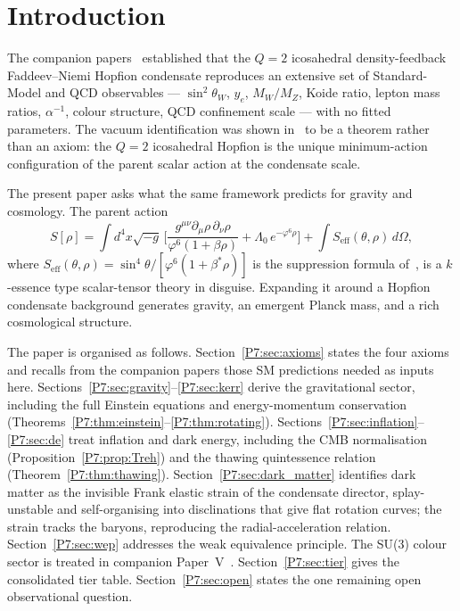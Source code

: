 \documentclass[11pt,a4paper]{article}
\theoremstyle{definition}
\theoremstyle{remark}
\newcommand{\vp}{\varphi}
\newcommand{\bst}{\beta^{*}}
\newcommand{\sinW}{\sin^{2}\!\theta_{W}}
\begin{document}
\tableofcontents
\bigskip

\section{Introduction}
\label{P7:sec:intro}

The companion papers~\cite{Paper1,Paper2,Paper3,Paper4,Paper5,Paper6} established
that the $Q=2$ icosahedral density-feedback Faddeev--Niemi Hopfion
condensate reproduces an extensive set of Standard-Model and QCD
observables --- $\sinW$, $y_e$, $M_W/M_Z$, Koide ratio, lepton
mass ratios, $\alpha^{-1}$, colour structure, QCD confinement scale --- with no fitted parameters.  The vacuum identification was shown
in~\cite{Paper1} to be a theorem rather than an axiom: the
$Q=2$ icosahedral Hopfion is the unique minimum-action configuration
of the parent scalar action at the condensate scale.

The present paper asks what the same framework predicts for
gravity and cosmology.  The parent action
\begin{equation}
  S[\rho] = \int d^4x\sqrt{-g}\,
  \biggl[\frac{g^{\mu\nu}\partial_\mu\rho\,\partial_\nu\rho}
              {\vp^6(1+\beta\rho)}
         + \Lambda_0\,e^{-\vp^6\rho}\biggr]
  + \int S_{\mathrm{eff}}(\theta,\rho)\,d\Omega,
  \label{P7:eq:parent_action}
\end{equation}
where $S_{\mathrm{eff}}(\theta,\rho) = \sin^4\!\theta/[\vp^6(1+\bst\rho)]$
is the suppression formula of~\cite{Paper1}, is a $k$-essence type
scalar-tensor theory in disguise.  Expanding it around a Hopfion
condensate background generates gravity, an emergent Planck mass,
and a rich cosmological structure.

The paper is organised as follows.
Section~\ref{P7:sec:axioms} states the four axioms and recalls from
the companion papers those SM predictions needed as inputs here.
Sections~\ref{P7:sec:gravity}--\ref{P7:sec:kerr} derive the gravitational
sector, including the full Einstein equations and energy-momentum
conservation (Theorems~\ref{P7:thm:einstein}--\ref{P7:thm:rotating}).
Sections~\ref{P7:sec:inflation}--\ref{P7:sec:de} treat inflation and dark
energy, including the CMB normalisation (Proposition~\ref{P7:prop:Treh})
and the thawing quintessence relation (Theorem~\ref{P7:thm:thawing}).
Section~\ref{P7:sec:dark_matter} identifies dark matter as the invisible
Frank elastic strain of the condensate director, splay-unstable and
self-organising into disclinations that give flat rotation curves; the
strain tracks the baryons, reproducing the radial-acceleration
relation.
Section~\ref{P7:sec:wep} addresses the weak equivalence principle.
The SU(3) colour sector is treated in companion Paper~V~\cite{Paper5}.
Section~\ref{P7:sec:tier} gives the consolidated tier table.
Section~\ref{P7:sec:open} states the one remaining open observational question.
\end{document}
